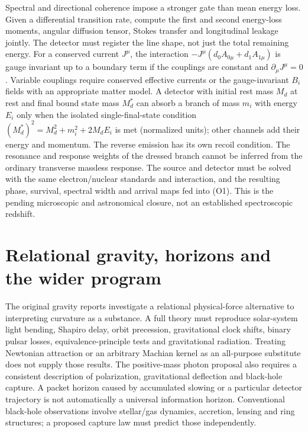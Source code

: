 \documentclass[
  11pt,
  twoside]{article}
\begin{document}
Spectral and directional coherence impose a stronger gate than mean
energy loss. Given a differential transition rate, compute the first and
second energy-loss moments, angular diffusion tensor, Stokes transfer
and longitudinal leakage jointly. The detector must register the line
shape, not just the total remaining energy. For a conserved current
\(J^\mu\), the interaction \(-J^\mu(d_0 A_{0\mu}+d_1 A_{1\mu})\) is
gauge invariant up to a boundary term if the couplings are constant and
\(\partial_\mu J^\mu=0\). Variable couplings require conserved effective
currents or the gauge-invariant \(B_i\) fields with an appropriate
matter model. A detector with initial rest mass \(M_d\) at rest and
final bound state mass \(M_d^*\) can absorb a branch of mass \(m_i\)
with energy \(E_i\) only when the isolated single-final-state condition
\((M_d^*)^2=M_d^2+m_i^2+2M_d E_i\) is met (normalized units); other
channels add their energy and momentum. The reverse emission has its own
recoil condition. The resonance and response weights of the dressed
branch cannot be inferred from the ordinary transverse massless
response. The source and detector must be solved with the same
electron/nuclear standards and interaction, and the resulting phase,
survival, spectral width and arrival maps fed into (O1). This is the
pending microscopic and astronomical closure, not an established
spectroscopic redshift.

\section{Relational gravity, horizons and the wider
program}\label{relational-gravity-horizons-and-the-wider-program}

The original gravity reports investigate a relational physical-force
alternative to interpreting curvature as a substance. A full theory must
reproduce solar-system light bending, Shapiro delay, orbit precession,
gravitational clock shifts, binary pulsar losses, equivalence-principle
tests and gravitational radiation. Treating Newtonian attraction or an
arbitrary Machian kernel as an all-purpose substitute does not supply
those results. The positive-mass photon proposal also requires a
consistent description of polarization, gravitational deflection and
black-hole capture. A packet horizon caused by accumulated slowing or a
particular detector trajectory is not automatically a universal
information horizon. Conventional black-hole observations involve
stellar/gas dynamics, accretion, lensing and ring structures; a proposed
capture law must predict those independently.
\end{document}
